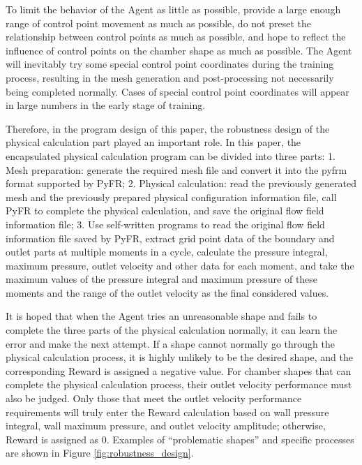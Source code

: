 \documentclass{article}
\begin{document}
To limit the behavior of the Agent as little as possible, provide a large enough range of control point movement as much as possible,
do not preset the relationship between control points as much as possible, and hope to reflect the influence of control points on the chamber shape as much as possible.
The Agent will inevitably try some special control point coordinates during the training process, resulting in the mesh generation and post-processing not necessarily being completed normally.
Cases of special control point coordinates will appear in large numbers in the early stage of training.

Therefore, in the program design of this paper, the robustness design of the physical calculation part played an important role.
In this paper, the encapsulated physical calculation program can be divided into three parts: 1. Mesh preparation: generate the required
mesh file and convert it into the pyfrm format supported by PyFR; 2. Physical calculation: read the previously generated mesh and the previously
prepared physical configuration information file, call PyFR to complete the physical calculation, and save the original flow field information file; 3. Use
self-written programs to read the original flow field information file saved by PyFR, extract grid point data of the boundary and outlet parts at
multiple moments in a cycle, calculate the pressure integral, maximum pressure, outlet
velocity and other data for each moment, and take the maximum values of the pressure integral and maximum pressure of these moments and the
range of the outlet velocity as the final considered values.

It is hoped that when the Agent tries an unreasonable shape and fails to complete the three parts of the physical calculation normally, it
can learn the error and make the next attempt. If a shape cannot normally go through the physical calculation process, it is highly
unlikely to be the desired shape, and the corresponding Reward is assigned a negative value. For chamber shapes
that can complete the physical calculation process, their outlet velocity performance must also be judged.
Only those that meet the outlet velocity performance requirements will truly enter the Reward calculation based on wall pressure integral, wall maximum pressure, and outlet velocity amplitude;
otherwise, Reward is assigned as 0.
Examples of ``problematic shapes'' and specific processes are shown in Figure \ref{fig:robustness_design}.
\end{document}
